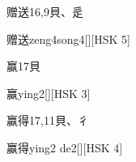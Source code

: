 \begin{entry}{赠送}{16,9}{⾙、⾡}
  \begin{phonetics}{赠送}{zeng4song4}[][HSK 5]
  \end{phonetics}
\end{entry}

\begin{entry}{赢}{17}{⾙}
  \begin{phonetics}{赢}{ying2}[][HSK 3]
  \end{phonetics}
\end{entry}

\begin{entry}{赢得}{17,11}{⾙、⼻}
  \begin{phonetics}{赢得}{ying2 de2}[][HSK 4]
  \end{phonetics}
\end{entry}


